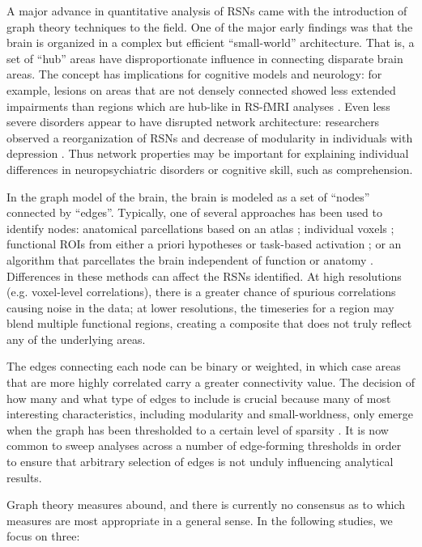 A major advance in quantitative analysis of RSNs came with the introduction of graph theory techniques to the field. One of the major early findings was that the brain is organized in a complex but efficient ``small-world'' architecture. That is, a set of ``hub'' areas have disproportionate influence in connecting disparate brain areas. The concept has implications for cognitive models and neurology: for example, lesions on areas that are not densely connected showed less extended impairments than regions which are hub-like in RS-fMRI analyses \citep{Warren2014}. Even less severe disorders appear to have disrupted network architecture: researchers observed a reorganization of RSNs and decrease of modularity in individuals with depression \citep{Lord2012}. Thus network properties may be important for explaining individual differences in neuropsychiatric disorders or cognitive skill, such as comprehension.

In the graph model of the brain, the brain is modeled as a set of ``nodes'' connected by ``edges''. Typically, one of several approaches has been used to identify nodes: anatomical parcellations based on an atlas \citep{Supekar2008, Liu2008, Lynall2010}; individual voxels \citep{Fair2007}; functional ROIs from either a priori hypotheses or task-based activation \citep{VandenHeuvel2010}; or an algorithm that parcellates the brain independent of function or anatomy \citep{Goni2014}. Differences in these methods can affect the RSNs identified. At high resolutions (e.g. voxel-level correlations), there is a greater chance of spurious correlations causing noise in the data; at lower resolutions, the timeseries for a region may blend multiple functional regions, creating a composite that does not truly reflect any of the underlying areas. 

The edges connecting each node can be binary or weighted, in which case areas that are more highly correlated carry a greater connectivity value. The decision of how many and what type of edges to include is crucial because many of most interesting characteristics, including modularity and small-worldness, only emerge when the graph has been thresholded to a certain level of sparsity \citep{Moussa2012}. It is now common to sweep analyses across a number of edge-forming thresholds in order to ensure that arbitrary selection of edges is not unduly influencing analytical results.

Graph theory measures abound, and there is currently no consensus as to which measures are most appropriate in a general sense. In the following studies, we focus on three: 


